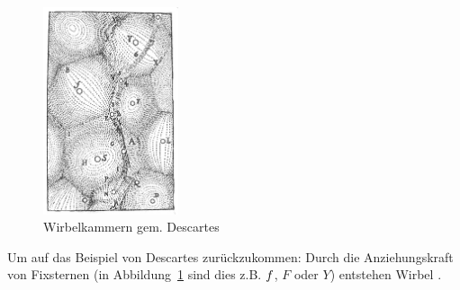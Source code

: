 \begin{figure}[h]
\centering
\includegraphics[width=150px]{images/descartes_vortices.jpg}
\caption{Wirbelkammern gem. Descartes\protect\footnotemark}
\label{fig:descartesVortices}
\end{figure}

Um auf das Beispiel von Descartes zurückzukommen: Durch die Anziehungskraft von Fixsternen (in Abbildung~\ref{fig:descartesVortices} sind dies z.B. $\mathnormal{f}$, $F$ oder $Y$) entstehen Wirbel \parencite[S. 209]{klein2005algorithmischegeometrie}.
